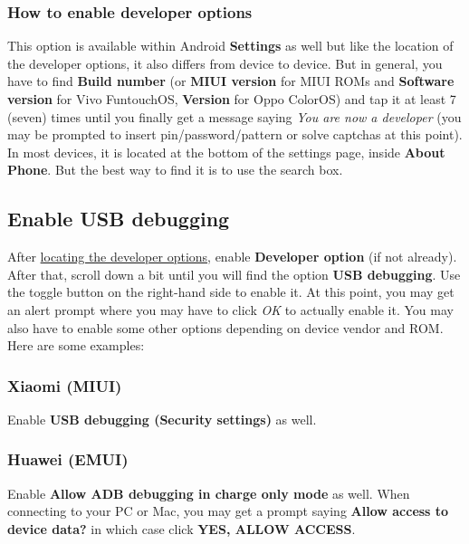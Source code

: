 \subsubsection{How to enable developer options} %
This option is available within Android \textbf{Settings} as well but like the location of the developer options, it
also differs from device to device. But in general, you have to find \textbf{Build number} (or \textbf{MIUI version} for
MIUI ROMs and \textbf{Software version} for Vivo FuntouchOS, \textbf{Version} for Oppo ColorOS) and tap it at least 7
(seven) times until you finally get a message saying \textit{You are now a developer} (you may be prompted to insert
pin/password/pattern or solve captchas at this point). In most devices, it is located at the bottom of the settings
page, inside \textbf{About Phone}. But the best way to find it is to use the search box.

\subsection{Enable USB debugging}\label{subsec:enable-usb-debugging} %
After \hyperref[subsubsec:location-of-developer-options]{locating the developer options}, enable \textbf{Developer
option} (if not already). After that, scroll down a bit until you will find the option \textbf{USB debugging}. Use the
toggle button on the right-hand side to enable it. At this point, you may get an alert prompt where you may have to
click \textit{OK} to actually enable it. You may also have to enable some other options depending on device vendor and
ROM. Here are some examples:

\subsubsection{Xiaomi (MIUI)} %
Enable \textbf{USB debugging (Security settings)} as well.

\subsubsection{Huawei (EMUI)} %
Enable \textbf{Allow ADB debugging in charge only mode} as well. When connecting to your PC or Mac, you may get a prompt
saying \textbf{Allow access to device data?} in which case click \textbf{YES, ALLOW ACCESS}.

